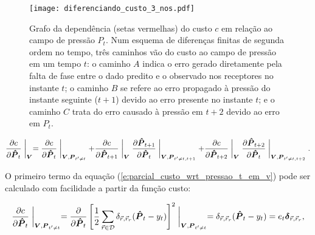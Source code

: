   \begin{figure}
    \begin{center}
      \texttt{[image: diferenciando\_custo\_3\_nos.pdf]}
    \end{center}
    \caption{Grafo da dependência (setas vermelhas) do custo $c$ em relação ao campo de pressão $P_t$. Num esquema de diferenças finitas de segunda ordem no tempo, três caminhos vão do custo ao campo de pressão em um tempo $t$: o caminho $A$ indica o erro gerado diretamente pela falta de fase entre o dado predito e o observado nos receptores no instante $t$; o caminho $B$ se refere ao erro propagado à pressão do instante seguinte ($t+1$) devido ao erro presente no instante $t$; e o caminho $C$ trata do erro causado à pressão em $t+2$ devido ao erro em $P_t$.}
    \label{f:diferenciando_custo_3_nos}
  \end{figure}

  \begin{equation} \label{e:parcial_custo_wrt_pressao_t_em_v}
    \frac{\partial c}{\partial \boldsymbol{\hat{P}}_t} \biggm\lvert_{\boldsymbol{V}} =
    \frac{\partial c}{\partial \boldsymbol{\hat{P}}_t} \biggm\lvert_{\boldsymbol{V}, \boldsymbol{P}_{t'\ne t}} + 
    \frac{\partial c}{\partial \boldsymbol{\hat{P}}_{t+1}} \biggm\lvert_{\boldsymbol{V}}
      \frac{\partial \boldsymbol{\hat{P}}_{t+1}}{\partial \boldsymbol{\hat{P}}_{t}} \biggm\lvert_{\boldsymbol{V}, \boldsymbol{P}_{t'\ne t, t+1}} +
    \frac{\partial c}{\partial \boldsymbol{\hat{P}}_{t+2}} \biggm\lvert_{\boldsymbol{V}}
      \frac{\partial \boldsymbol{\hat{P}}_{t+2}}{\partial \boldsymbol{\hat{P}}_{t}} \biggm\lvert_{\boldsymbol{V}, \boldsymbol{P}_{t'\ne t, t+2}}
    .
  \end{equation}

    O primeiro termo da equação (\ref{e:parcial_custo_wrt_pressao_t_em_v}) pode ser calculado com facilidade a partir da função custo:

  \begin{equation} \label{e:parcial_custo_wrt_pressao_t_em_v_e_t}
    \frac{\partial c}{\partial \boldsymbol{\hat{P}}_t} \biggm\lvert_{\boldsymbol{V}, \boldsymbol{P}_{t'\ne t}} =
    \frac{\partial}{\partial \boldsymbol{\hat{P}}_t}
      \left[\frac{1}{2}
        \sum \limits_{\vec{r} \in \mathcal{D}} \delta_{\vec{r}, \vec{r}_r}
        (\boldsymbol{\hat{P}}_t - y_t)
      \right]^2 \biggm\lvert_{\boldsymbol{V}, \boldsymbol{P}_{t'\ne t}} = 
      \delta_{\vec{r}, \vec{r}_r} (\boldsymbol{\hat{P}}_t - y_t) =
      e_t \boldsymbol{\delta}_{\vec{r}, \vec{r}_r}
    ,
  \end{equation}

